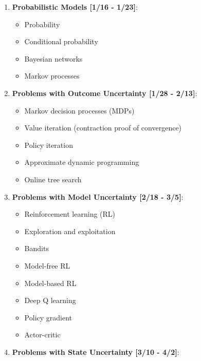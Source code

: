 \documentclass[10pt]{article}
\begin{document}
\begin{enumerate}[noitemsep]
    \item \textbf{Probabilistic Models [1/16 - 1/23]}:
        \begin{multicols}{2}
            \begin{itemize}[noitemsep]
                \item Probability
                \item Conditional probability
                \item Bayesian networks
                \item Markov processes
            \end{itemize}
        \end{multicols}
    \item \textbf{Problems with Outcome Uncertainty [1/28 - 2/13]}:
        \begin{multicols}{2}
        \begin{itemize}[noitemsep]
            \item Markov decision processes (MDPs)
            \item Value iteration (contraction proof of convergence)
            \item Policy iteration
            \item Approximate dynamic programming
            \item Online tree search
        \end{itemize}
        \end{multicols}
    \item \textbf{Problems with Model Uncertainty [2/18 - 3/5]}:
        \begin{multicols}{2}
        \begin{itemize}[noitemsep]
            \item Reinforcement learning (RL)
            \item Exploration and exploitation
            \item Bandits
            \item Model-free RL
            \item Model-based RL
            \item Deep Q learning
            \item Policy gradient
            \item Actor-critic
        \end{itemize}
        \end{multicols}
    \item \textbf{Problems with State Uncertainty [3/10 - 4/2]}:

\end{enumerate}
\end{document}

